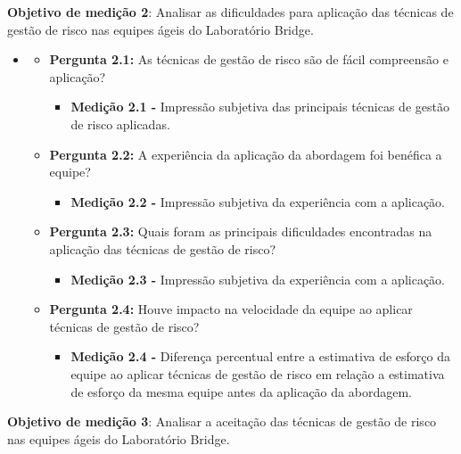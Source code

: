 \documentclass[
    12pt,       %
    openright,      %
    twoside,      %
    a4paper,      %
    english,      %
    french,       %
    spanish,      %
    brazil,       %
    ]{abntex2}
\begin{document}
\textbf{Objetivo de medição 2}: Analisar as dificuldades para aplicação das técnicas de gestão de risco nas equipes ágeis do Laboratório Bridge.

\begin{itemize}[label={}]
\item
\begin{itemize}
        \item \textbf{Pergunta 2.1:} As técnicas de gestão de risco são de fácil compreensão e aplicação?
            \begin{itemize}[label={}]
                \item \textbf{Medição 2.1 - } Impressão subjetiva das principais técnicas de gestão de risco aplicadas.
            \end{itemize}
        \item \textbf{Pergunta 2.2:} A experiência da aplicação da abordagem foi benéfica a equipe?
            \begin{itemize}[label={}]
                \item \textbf{Medição 2.2 - } Impressão subjetiva da experiência com a aplicação.
            \end{itemize}        
        \item \textbf{Pergunta 2.3:} Quais foram as principais dificuldades encontradas na aplicação das técnicas de gestão de risco?
            \begin{itemize}[label={}]
                \item \textbf{Medição 2.3 - } Impressão subjetiva da experiência com a aplicação.
            \end{itemize}    
        \item \textbf{Pergunta 2.4:} Houve impacto na velocidade da equipe ao aplicar técnicas de gestão de risco?
            \begin{itemize}[label={}]
                \item \textbf{Medição 2.4 -} 
                Diferença percentual entre a estimativa de esforço da equipe ao aplicar técnicas de gestão de risco em relação a estimativa de esforço da mesma equipe antes da aplicação da abordagem.
            \end{itemize}        
\end{itemize}
\end{itemize}

\textbf{Objetivo de medição 3}: Analisar a aceitação das técnicas de gestão de risco nas equipes ágeis do Laboratório Bridge.
\end{document}
